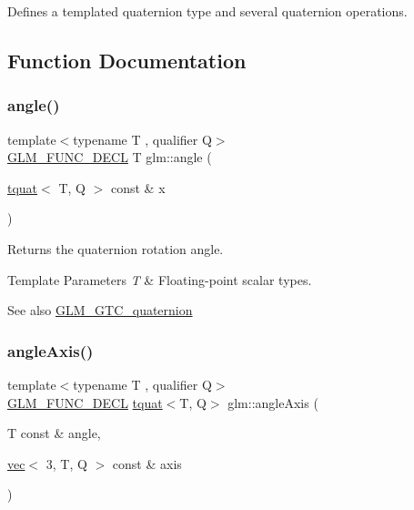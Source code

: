 Defines a templated quaternion type and several quaternion operations. 

\subsection{Function Documentation}
\mbox{\label{group__gtc__quaternion_gaaee6c856cae3217d274a240238cb6373}} 
\subsubsection{\texorpdfstring{angle()}{angle()}}
{\footnotesize\ttfamily template$<$typename T , qualifier Q$>$ \\
\mbox{\hyperlink{setup_8hpp_ab2d052de21a70539923e9bcbf6e83a51}{G\+L\+M\+\_\+\+F\+U\+N\+C\+\_\+\+D\+E\+CL}} T glm\+::angle (\begin{DoxyParamCaption}\item[{\mbox{\hyperlink{structglm_1_1tquat}{tquat}}$<$ T, Q $>$ const \&}]{x }\end{DoxyParamCaption})}

Returns the quaternion rotation angle.


\begin{DoxyTemplParams}{Template Parameters}
{\em T} & Floating-\/point scalar types.\\
\hline
\end{DoxyTemplParams}
\begin{DoxySeeAlso}{See also}
\mbox{\hyperlink{group__gtc__quaternion}{G\+L\+M\+\_\+\+G\+T\+C\+\_\+quaternion}} 
\end{DoxySeeAlso}
\mbox{\label{group__gtc__quaternion_ga93856b8bfcdd5b9a164248df3149476c}} 
\subsubsection{\texorpdfstring{angle\+Axis()}{angleAxis()}}
{\footnotesize\ttfamily template$<$typename T , qualifier Q$>$ \\
\mbox{\hyperlink{setup_8hpp_ab2d052de21a70539923e9bcbf6e83a51}{G\+L\+M\+\_\+\+F\+U\+N\+C\+\_\+\+D\+E\+CL}} \mbox{\hyperlink{structglm_1_1tquat}{tquat}}$<$T, Q$>$ glm\+::angle\+Axis (\begin{DoxyParamCaption}\item[{T const \&}]{angle,  }\item[{\mbox{\hyperlink{structglm_1_1vec}{vec}}$<$ 3, T, Q $>$ const \&}]{axis }\end{DoxyParamCaption})}

